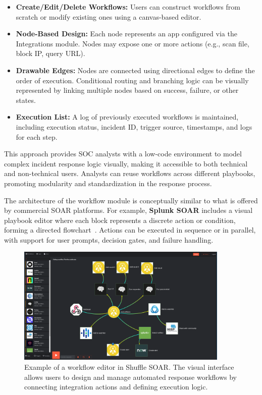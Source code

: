 \begin{itemize}
    \item \textbf{Create/Edit/Delete Workflows:} Users can construct workflows from scratch or modify existing ones using a canvas-based editor.
    
    \item \textbf{Node-Based Design:} Each node represents an app configured via the Integrations module. Nodes may expose one or more actions (e.g., scan file, block IP, query URL).
    
    \item \textbf{Drawable Edges:} Nodes are connected using directional edges to define the order of execution. Conditional routing and branching logic can be visually represented by linking multiple nodes based on success, failure, or other states.
    
    \item \textbf{Execution List:} A log of previously executed workflows is maintained, including execution status, incident ID, trigger source, timestamps, and logs for each step.
\end{itemize}

This approach provides SOC analysts with a low-code environment to model complex incident response logic visually, making it accessible to both technical and non-technical users. Analysts can reuse workflows across different playbooks, promoting modularity and standardization in the response process.

The architecture of the workflow module is conceptually similar to what is offered by commercial SOAR platforms. For example, \textbf{Splunk SOAR} includes a visual playbook editor where each block represents a discrete action or condition, forming a directed flowchart~\cite{splunk}. Actions can be executed in sequence or in parallel, with support for user prompts, decision gates, and failure handling.

\begin{figure}[ht]
    \centering
    \includegraphics[width=0.9\textwidth]{images/shuffle_soar_workflow.png}
        \caption[Example of a workflow editor in Shuffle SOAR]{Example of a workflow editor in Shuffle SOAR. The visual interface allows users to design and manage automated response workflows by connecting integration actions and defining execution logic.}
    \label{fig:shuffle-soar-workflow}
\end{figure}

